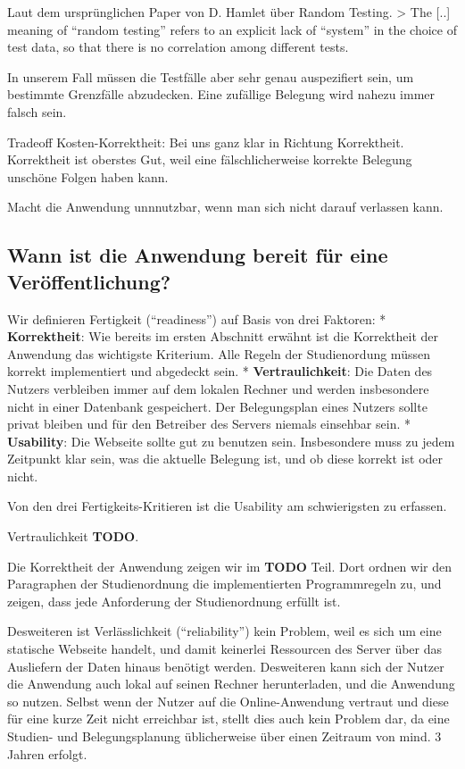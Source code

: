 \documentclass[ngerman]{article}
\begin{document}
Laut dem ursprünglichen Paper von D. Hamlet über Random Testing.
\textgreater{} The {[}..{]} meaning of ``random testing'' refers to an
explicit lack of ``system'' in the choice of test data, so that there is
no correlation among different tests.

In unserem Fall müssen die Testfälle aber sehr genau auspezifiert sein,
um bestimmte Grenzfälle abzudecken. Eine zufällige Belegung wird nahezu
immer falsch sein.

Tradeoff Kosten-Korrektheit: Bei uns ganz klar in Richtung Korrektheit.
Korrektheit ist oberstes Gut, weil eine fälschlicherweise korrekte
Belegung unschöne Folgen haben kann.

Macht die Anwendung unnnutzbar, wenn man sich nicht darauf verlassen
kann.

\subsection{Wann ist die Anwendung bereit für eine Veröffentlichung?}

Wir definieren Fertigkeit (``readiness'') auf Basis von drei Faktoren: *
\textbf{Korrektheit}: Wie bereits im ersten Abschnitt erwähnt ist die
Korrektheit der Anwendung das wichtigste Kriterium. Alle Regeln der
Studienordung müssen korrekt implementiert und abgedeckt sein. *
\textbf{Vertraulichkeit}: Die Daten des Nutzers verbleiben immer auf dem
lokalen Rechner und werden insbesondere nicht in einer Datenbank
gespeichert. Der Belegungsplan eines Nutzers sollte privat bleiben und
für den Betreiber des Servers niemals einsehbar sein. *
\textbf{Usability}: Die Webseite sollte gut zu benutzen sein.
Insbesondere muss zu jedem Zeitpunkt klar sein, was die aktuelle
Belegung ist, und ob diese korrekt ist oder nicht.

Von den drei Fertigkeits-Kritieren ist die Usability am schwierigsten zu
erfassen.

Vertraulichkeit \textbf{TODO}.

Die Korrektheit der Anwendung zeigen wir im \textbf{TODO} Teil. Dort
ordnen wir den Paragraphen der Studienordnung die implementierten
Programmregeln zu, und zeigen, dass jede Anforderung der Studienordnung
erfüllt ist.

Desweiteren ist Verlässlichkeit (``reliability'') kein Problem, weil es
sich um eine statische Webseite handelt, und damit keinerlei Ressourcen
des Server über das Ausliefern der Daten hinaus benötigt werden.
Desweiteren kann sich der Nutzer die Anwendung auch lokal auf seinen
Rechner herunterladen, und die Anwendung so nutzen. Selbst wenn der
Nutzer auf die Online-Anwendung vertraut und diese für eine kurze Zeit
nicht erreichbar ist, stellt dies auch kein Problem dar, da eine
Studien- und Belegungsplanung üblicherweise über einen Zeitraum von
mind. 3 Jahren erfolgt.
\end{document}

